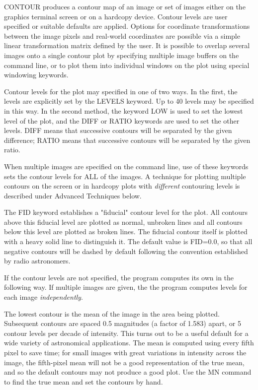 CONTOUR produces a contour map of an image or set of images either on the
graphics terminal screen or on a hardcopy device.  Contour levels are user
specified or suitable defaults are applied.  Options for coordinate
transformations between the image pixels and real-world coordinates are
possible via a simple linear transformation matrix defined by the user.  It
is possible to overlap several images onto a single contour plot by
specifying multiple image buffers on the command line, or to plot them into
individual windows on the plot using special windowing keywords.
 
 
Contour levels for the plot may specified in one of two ways.  In the
first, the levels are explicitly set by the LEVELS keyword.  Up to 40
levels may be specified in this way.  In the second method, the keyword LOW
is used to set the lowest level of the plot, and the DIFF or RATIO keywords
are used to set the other levels.  DIFF means that successive contours will
be separated by the given difference; RATIO means that successive contours
will be separated by the given ratio.
 
When multiple images are specified on the command line, use of these
keywords sets the contour levels for ALL of the images.  A technique for
plotting multiple contours on the screen or in hardcopy plots with
\textit{different} contouring levels is described under Advanced Techniques
below.

The FID keyword establishes a "fiducial" contour level for the plot. All
contours above this fiducial level are plotted as normal, unbroken lines
and all contours below this level are plotted as broken lines.  The
fiducial contour itself is plotted with a heavy solid line to distinguish
it.  The default value is FID=0.0, so that all negative contours will be
dashed by default following the convention established by radio
astronomers.
 
If the contour levels are not specified, the program computes its own in
the following way.  If multiple images are given, the the program computes
levels for each image \textit{independently}.
 
The lowest contour is the mean of the image in the area being plotted.
Subsequent contours are spaced 0.5 magnitudes (a factor of 1.583) apart, or
5 contour levels per decade of intensity.  This turns out to be a useful
default for a wide variety of astronomical applications. The mean is
computed using every fifth pixel to save time; for small images with great
variations in intensity across the image, the fifth-pixel mean will not be
a good representation of the true mean, and so the default contours may not
produce a good plot.  Use the MN command to find the true mean and set the
contours by hand.
 
